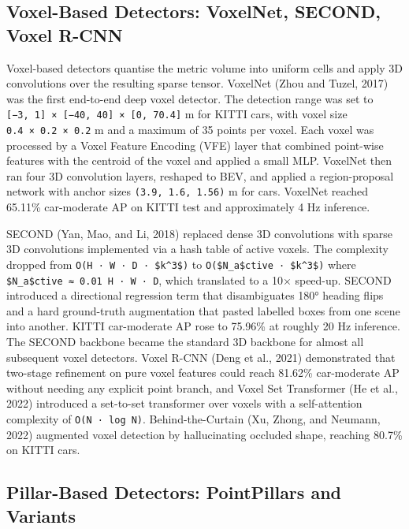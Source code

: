 \subsection{Voxel-Based Detectors: VoxelNet, SECOND, Voxel R-CNN}\label{voxel-based-detectors-voxelnet-second-voxel-r-cnn}

Voxel-based detectors quantise the metric volume into uniform cells and apply 3D convolutions over the resulting sparse tensor. VoxelNet (Zhou and Tuzel, 2017) was the first end-to-end deep voxel detector. The detection range was set to \texttt{{[}−3,\ 1{]}\ ×\ {[}−40,\ 40{]}\ ×\ {[}0,\ 70.4{]}} m for KITTI cars, with voxel size \texttt{0.4\ ×\ 0.2\ ×\ 0.2} m and a maximum of 35 points per voxel. Each voxel was processed by a Voxel Feature Encoding (VFE) layer that combined point-wise features with the centroid of the voxel and applied a small MLP. VoxelNet then ran four 3D convolution layers, reshaped to BEV, and applied a region-proposal network with anchor sizes \texttt{(3.9,\ 1.6,\ 1.56)} m for cars. VoxelNet reached 65.11\% car-moderate AP on KITTI test and approximately 4 Hz inference.

SECOND (Yan, Mao, and Li, 2018) replaced dense 3D convolutions with sparse 3D convolutions implemented via a hash table of active voxels. The complexity dropped from \texttt{O(H\ ·\ W\ ·\ D\ ·\ \$k\^{}3\$)} to \texttt{O(\$N\_a\$ctive\ ·\ \$k\^{}3\$)} where \texttt{\$N\_a\$ctive\ ≈\ 0.01\ H\ ·\ W\ ·\ D}, which translated to a 10× speed-up. SECOND introduced a directional regression term that disambiguates 180° heading flips and a hard ground-truth augmentation that pasted labelled boxes from one scene into another. KITTI car-moderate AP rose to 75.96\% at roughly 20 Hz inference. The SECOND backbone became the standard 3D backbone for almost all subsequent voxel detectors. Voxel R-CNN (Deng et al., 2021) demonstrated that two-stage refinement on pure voxel features could reach 81.62\% car-moderate AP without needing any explicit point branch, and Voxel Set Transformer (He et al., 2022) introduced a set-to-set transformer over voxels with a self-attention complexity of \texttt{O(N\ ·\ log\ N)}. Behind-the-Curtain (Xu, Zhong, and Neumann, 2022) augmented voxel detection by hallucinating occluded shape, reaching 80.7\% on KITTI cars.

\subsection{Pillar-Based Detectors: PointPillars and Variants}\label{pillar-based-detectors-pointpillars-and-variants}

